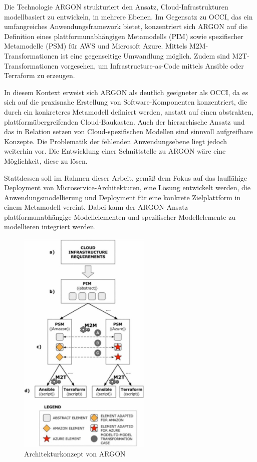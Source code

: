 Die Technologie ARGON strukturiert den Ansatz, Cloud-Infrastrukturen modellbasiert zu entwickeln, in mehrere Ebenen. Im Gegensatz zu OCCI, das ein umfangreiches Anwendungsframework bietet, konzentriert sich ARGON auf die Definition eines plattformunabhängigen Metamodells (PIM) sowie spezifischer Metamodelle (PSM) für AWS und Microsoft Azure. Mittels M2M-Transformationen ist eine gegenseitige Umwandlung möglich. Zudem sind M2T-Transformationen vorgesehen, um Infrastructure-as-Code mittels Ansible oder Terraform zu erzeugen.

In diesem Kontext erweist sich ARGON als deutlich geeigneter als OCCI, da es sich auf die praxisnahe Erstellung von Software-Komponenten konzentriert, die durch ein konkreteres Metamodell definiert werden, anstatt auf einen abstrakten, plattformübergreifenden Cloud-Baukasten. Auch der hierarchische Ansatz und das in Relation setzen von Cloud-spezifischen Modellen sind sinnvoll aufgreifbare Konzepte.
Die Problematik der fehlenden Anwendungsebene liegt jedoch weiterhin vor. Die Entwicklung einer Schnittstelle zu ARGON wäre eine Möglichkeit, diese zu lösen.

Stattdessen soll im Rahmen dieser Arbeit, gemäß dem Fokus auf das lauffähige Deployment von Microservice-Architekturen, eine Lösung entwickelt werden, die Anwendungsmodellierung und Deployment für eine konkrete Zielplattform in einem Metamodell vereint. Dabei kann der ARGON-Ansatz plattformunabhängige Modellelementen und spezifischer Modellelemente zu modellieren integriert werden. 

\begin{figure}[ht]
\centering
\includegraphics[height=11cm]{bilder/k3/k3_argon.jpg}
\caption[Architekturkonzept von ARGON]{Architekturkonzept von ARGON \cite{argon}}
\end{figure}

